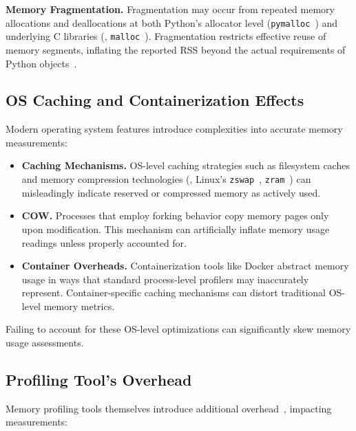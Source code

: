 \textbf{Memory Fragmentation.} Fragmentation may occur from repeated memory allocations and deallocations at both Python’s allocator level (\texttt{pymalloc}~\cite{pymalloc}) and underlying C libraries (\eg, \texttt{malloc}~\cite{malloc}).
Fragmentation restricts effective reuse of memory segments, inflating the reported \ac{RSS} beyond the actual requirements of Python objects~\cite{lamprakos2022impact}.

\subsection{\ac{OS} Caching and Containerization Effects}
\label{subsec:mmc-challenges-os-caching}

Modern operating system features introduce complexities into accurate memory measurements:

\begin{itemize}

    \item \textbf{Caching Mechanisms.} \ac{OS}-level caching strategies such as filesystem caches and memory compression technologies (\eg, Linux’s \texttt{zswap}~\cite{zswap}, \texttt{zram}~\cite{zram}) can misleadingly indicate reserved or compressed memory as actively used.

    \item \textbf{\ac{COW}.} Processes that employ forking behavior copy memory pages only upon modification.
    This mechanism can artificially inflate memory usage readings unless properly accounted for.

    \item \textbf{Container Overheads.} Containerization tools like Docker abstract memory usage in ways that standard process-level profilers may inaccurately represent.
    Container-specific caching mechanisms can distort traditional \ac{OS}-level memory metrics.
\end{itemize}

Failing to account for these \ac{OS}-level optimizations can significantly skew memory usage assessments.

\subsection{Profiling Tool's Overhead}
\label{subsec:mmc-challenges-tool-overhead}

Memory profiling tools themselves introduce additional overhead~\cite{scalene}, impacting measurements:

